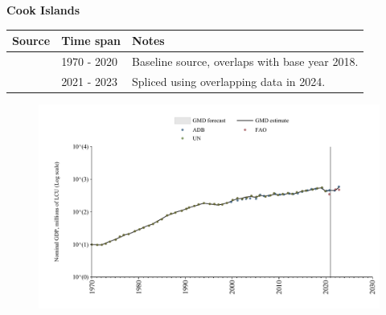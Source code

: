 \documentclass[12pt,a4paper,landscape]{article}
\begin{document}
\begin{adjustbox}{max totalsize={\paperwidth}{\paperheight},center}
\begin{minipage}[t][\textheight][t]{\textwidth}
\vspace*{0.5cm}
{}
\begin{center}
{\Large\bfseries Cook Islands}
\end{center}
\vspace{0.5cm}
\begin{table}[H]
\centering
\small
\begin{tabular}{|l|l|l|}
\hline
\textbf{Source} & \textbf{Time span} & \textbf{Notes} \\
\hline
\rowcolor{white}\cite{UN}& 1970 - 2020 &Baseline source, overlaps with base year 2018.\\
\rowcolor{lightgray}\cite{ADB}& 2021 - 2023 &Spliced using overlapping data in 2024.\\
\hline
\end{tabular}
\end{table}
\begin{figure}[H]
\centering
\includegraphics[width=\textwidth,height=0.6\textheight,keepaspectratio]{graphs/COK_nGDP.pdf}
\end{figure}
\end{minipage}
\end{adjustbox}
\end{document}
